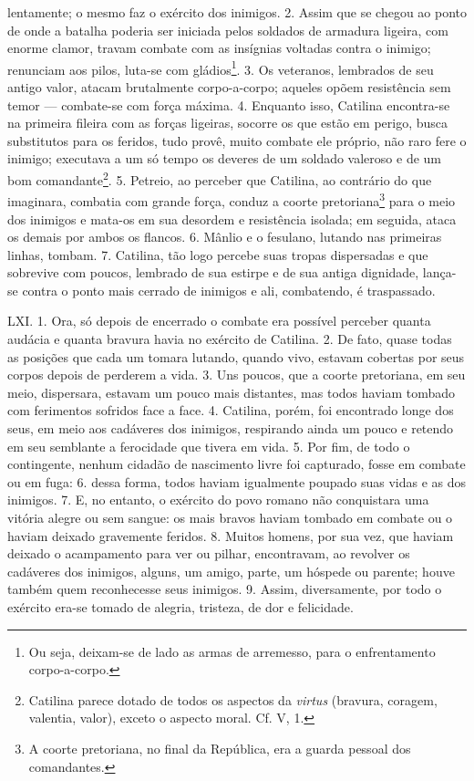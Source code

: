 lentamente; o mesmo faz o exército dos inimigos. 2. Assim que se chegou ao
ponto de onde a batalha poderia ser iniciada pelos soldados de armadura
ligeira, com enorme clamor, travam combate com as insígnias voltadas contra o
inimigo; renunciam aos pilos, luta-se com gládios\footnote{Ou seja, deixam-se
de lado as armas de arremesso, para o enfrentamento corpo-a-corpo.}. 3. Os
veteranos, lembrados de seu antigo valor, atacam brutalmente corpo-a-corpo;
aqueles opõem resistência sem temor --- combate-se com força máxima. 4.
Enquanto isso, Catilina encontra-se na primeira fileira com as forças ligeiras,
socorre os que estão em perigo, busca substitutos para os feridos, tudo provê,
muito combate ele próprio, não raro fere o inimigo; executava a um só tempo os
deveres de um soldado valeroso e de um bom comandante\footnote{Catilina parece
dotado de todos os aspectos da \emph{virtus} (bravura, coragem, valentia,
valor), exceto o aspecto moral. Cf. V, 1.}. 5. Petreio, ao perceber que
Catilina, ao contrário do que imaginara, combatia com grande força, conduz a
coorte pretoriana\footnote{A coorte pretoriana, no final da República, era a
guarda pessoal dos comandantes.} para o meio dos inimigos e mata-os em sua
desordem e resistência isolada; em seguida, ataca os demais por ambos os
flancos. 6. Mânlio e o fesulano, lutando nas primeiras linhas, tombam. 7.
Catilina, tão logo percebe suas tropas dispersadas e que sobrevive com poucos,
lembrado de sua estirpe e de sua antiga dignidade, lança-se contra o ponto mais
cerrado de inimigos e ali, combatendo, é traspassado. 

LXI. 1. Ora, só depois de encerrado o combate era possível perceber quanta
audácia e quanta bravura havia no exército de Catilina. 2. De fato, quase todas
as posições que cada um tomara lutando, quando vivo, estavam cobertas por seus
corpos depois de perderem a vida. 3. Uns poucos, que a coorte pretoriana, em
seu meio, dispersara, estavam um pouco mais distantes, mas todos haviam tombado
com ferimentos sofridos face a face. 4. Catilina, porém, foi encontrado longe
dos seus, em meio aos cadáveres dos inimigos, respirando ainda um pouco e
retendo em seu semblante a ferocidade que tivera em vida. 5. Por fim, de todo o
contingente, nenhum cidadão de nascimento livre foi capturado, fosse em combate
ou em fuga: 6. dessa forma, todos haviam igualmente poupado suas vidas e as dos
inimigos. 7. E, no entanto, o exército do povo romano não conquistara uma
vitória alegre ou sem sangue: os mais bravos haviam tombado em combate ou o
haviam deixado gravemente feridos. 8. Muitos homens, por sua vez, que haviam
deixado o acampamento para ver ou pilhar, encontravam, ao revolver os cadáveres
dos inimigos, alguns, um amigo, parte, um hóspede ou parente; houve também quem
reconhecesse seus inimigos. 9. Assim, diversamente, por todo o exército era-se
tomado de alegria, tristeza, de dor e felicidade. 

